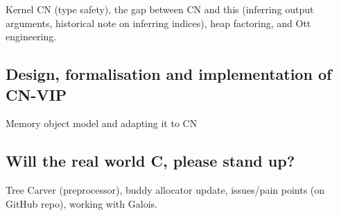 Kernel CN (type safety), the gap between CN and this (inferring output
arguments, historical note on inferring indices), heap factoring, and Ott
engineering.

\subsection{Design, formalisation and implementation of CN-VIP}

Memory object model and adapting it to CN

\subsection{Will the real world C, please stand up?}

Tree Carver (preprocessor), buddy allocator update, issues/pain points (on
GitHub repo), working with Galois.


